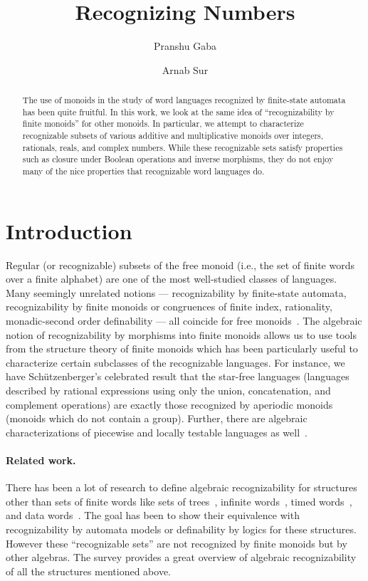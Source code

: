 \documentclass{llncs}
\title{Recognizing Numbers}
\author{Pranshu Gaba\inst{1}\orcidID{0009-0000-8012-780X} \and Arnab Sur\inst{2}\orcidID{0009-0007-5811-2864}}
\institute{Tata Institute of Fundamental Research, Mumbai, India
\email{pranshu.gaba@tifr.res.in}\\
  \and Chennai Mathematical Institute, Chennai, India
  \email{arnabs@cmi.ac.in}
}
\begin{document}
\maketitle

\begin{abstract}
  The use of monoids in the study of word languages recognized by finite-state automata has been quite fruitful. In this work, we look at the same idea of “recognizability by finite monoids” for other monoids. In particular, we attempt to characterize recognizable subsets of various additive and multiplicative monoids over integers, rationals, reals, and complex numbers. While these recognizable sets satisfy properties such as closure under Boolean operations and inverse morphisms, they do not enjoy many of the nice properties that recognizable word languages do.

\end{abstract}

\section{Introduction} \label{sec:intro}
Regular (or recognizable) subsets of the free monoid (i.e., the set of finite words over a finite alphabet) are one of the most well-studied classes of languages. Many seemingly unrelated notions --- recognizability by finite-state automata, recognizability by finite monoids or congruences of finite index, rationality, monadic-second order definability --- all coincide for free monoids~\cite{eilenberg1974automata,sakarovitch2009elements,pin2010mathematical}. The algebraic notion of recognizability by morphisms into finite monoids allows us to use tools from the structure theory of finite monoids which has been particularly useful to characterize certain subclasses of the recognizable languages. For instance, we have Schützenberger’s celebrated result that the star-free languages (languages described by rational expressions using only the union, concatenation, and complement operations) are exactly those recognized by aperiodic monoids (monoids which do not contain a group). Further, there are algebraic characterizations of piecewise and locally testable languages as well~\cite{eilenberg1974automata, pin2010mathematical}.

\paragraph*{Related work.}
There has been a lot of research to define algebraic recognizability for structures other than sets of finite words like sets of trees~\cite{gecseg2015tree}, infinite words~\cite{perrin1992infinite}, timed words~\cite{maler2004recognizable, bouyer2001algebraic}, and data words~\cite{bouyer2001algebraic,bojanczyk2013nominal}. The goal has been to show their equivalence with recognizability by automata models or definability by logics for these structures. However these ``recognizable sets'' are not recognized by finite monoids but by other algebras. The survey \cite{10.1007/978-3-540-28629-5_8} provides a great overview of algebraic recognizability of all the structures mentioned above.
\end{document}

